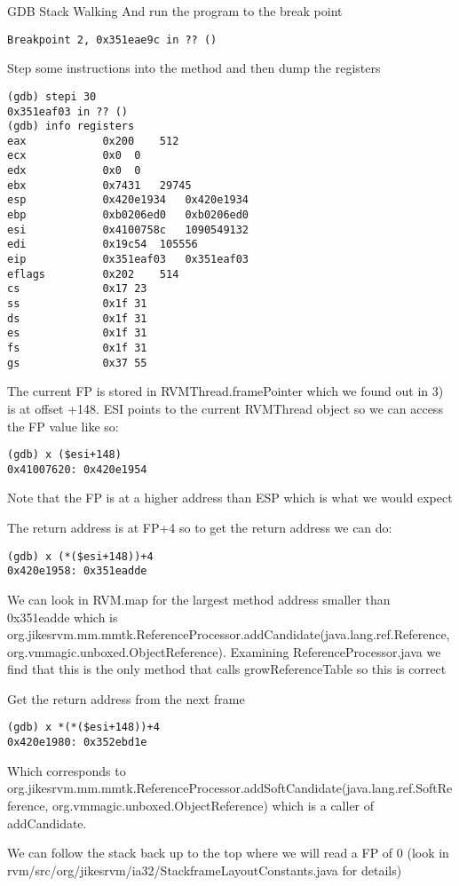 \begin{section}{GDB Stack Walking}
And run the program to the break point

\begin{lstlisting}
Breakpoint 2, 0x351eae9c in ?? ()
\end{lstlisting}

Step some instructions into the method and then dump the registers

\begin{lstlisting}
(gdb) stepi 30
0x351eaf03 in ?? ()
(gdb) info registers
eax            0x200	512
ecx            0x0	0
edx            0x0	0
ebx            0x7431	29745
esp            0x420e1934	0x420e1934
ebp            0xb0206ed0	0xb0206ed0
esi            0x4100758c	1090549132
edi            0x19c54	105556
eip            0x351eaf03	0x351eaf03
eflags         0x202	514
cs             0x17	23
ss             0x1f	31
ds             0x1f	31
es             0x1f	31
fs             0x1f	31
gs             0x37	55
\end{lstlisting}

The current FP is stored in RVMThread.framePointer which we found out in 3) is at offset +148. ESI points to the current RVMThread object so we can access the FP value like so:

\begin{lstlisting}
(gdb) x ($esi+148)
0x41007620:	0x420e1954
\end{lstlisting}

Note that the FP is at a higher address than ESP which is what we would expect

The return address is at FP+4 so to get the return address we can do:

\begin{lstlisting}
(gdb) x (*($esi+148))+4
0x420e1958:	0x351eadde
\end{lstlisting}

We can look in RVM.map for the largest method address smaller than 0x351eadde which is org.jikes\-rvm.mm.mmtk.Reference\-Processor.add\-Can\-di\-da\-te(java.\-lang.\-ref.\-Re\-fe\-rence, org.vmmagic.unboxed.Object\-Reference). Examining ReferenceProcessor.java we find that this is the only method that calls growReferenceTable so this is correct

Get the return address from the next frame

\begin{lstlisting}
(gdb) x *(*($esi+148))+4
0x420e1980:	0x352ebd1e
\end{lstlisting}

Which corresponds to org.jikes\-rvm.mm.mmtk.Reference\-Processor.add\-Soft\-Can\-di\-da\-te(java.\-lang\-.ref.\-Soft\-Reference, org.vmmagic.unboxed.Object\-Reference) which is a caller of addCandidate.

We can follow the stack back up to the top where we will read a FP of 0 (look in rvm/src/org/jikesrvm/ia32/StackframeLayoutConstants.java for details)

\end{section}
